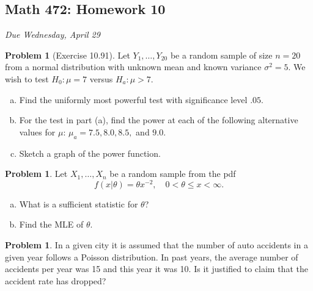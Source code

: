 \documentclass[10pt]{article}
\theoremstyle{definition}
\newtheorem{problem}[theorem]{Problem}
\newcommand{\1}[1]{\textbf{1}_{\left[#1\right]}} %
\begin{document}
\begin{center}
  \section*{Math 472: Homework 10}
  \textit{Due Wednesday, April 29}
\end{center}


\begin{problem}[Exercise 10.91]
  Let $Y_{1},\ldots,Y_{20}$ be a random sample of size $n=20$ from a normal
  distribution with unknown mean and known variance $\sigma^{2}=5$. We wish to
  test $H_{0}:\mu=7$ versus $H_{a}:\mu>7$.
  \begin{enumerate}[(a)]
    \item Find the uniformly most powerful test with significance level $.05$.
    \item For the test in part (a), find the power at each of the following
    alternative values for $\mu$: $\mu_{a}=7.5, 8.0, 8.5, $ and $9.0$. 
    \item Sketch a graph of the power function.
  \end{enumerate}
\end{problem}


\begin{problem}
  Let $X_1,\ldots,X_n$ be a random sample from the pdf
  \begin{equation*}
    f(x|\theta)=\theta x^{-2},\quad 0<\theta\leq x<\infty.
  \end{equation*}
  \begin{enumerate}[(a)]
    \item What is a sufficient statistic for $\theta$?
    \item Find the MLE of $\theta$.
  \end{enumerate}
\end{problem}


\begin{problem}
  In a given city it is assumed that the number of auto accidents in a given
  year follows a Poisson distribution. In past years, the average number of
  accidents per year was 15 and this year it was 10. Is it justified to claim
  that the accident rate has dropped?
\end{problem}
\end{document}
